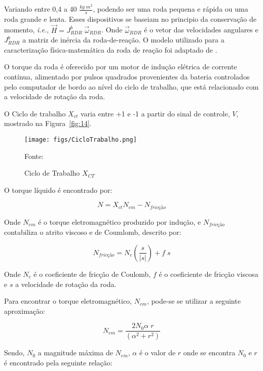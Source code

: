 Variando entre 0,4 a 40 $\frac{kg\;m^2}{s}$, podendo ser uma roda pequena e rápida ou uma roda grande e lenta. Esses dispositivos se baseiam no principio da conservação de momento, \textit{i.e.}, $\vec{H}=J^b_{RDR}\;\vec{\omega}_{RDR}$. Onde $\vec{\omega}_{RDR}$ é o vetor das velocidades angulares e $J^b_{RDR}$ a matriz de inércia da roda-de-reação. O modelo utilizado para a caracterização física-matemática da roda de reação foi adaptado de \cite[p.~270-271]{wertz2012spacecraft}.

O torque da roda é oferecido por um motor de indução elétrica de corrente contínua, alimentado por pulsos quadrados provenientes da bateria controlados pelo computador de bordo ao nível do ciclo de trabalho, que está relacionado com a velocidade de rotação da roda.

O Ciclo de trabalho $X_{ct}$ varia entre +1 e -1 a partir do sinal de controle, $V$, mostrado na Figura~\ref{fig:14}.

\begin{figure}[htpb]
\centering
\texttt{[image: figs/CicloTrabalho.png]}
\caption{Ciclo de Trabalho $X_{CT}$}
{Fonte: \cite[p.~271]{wertz2012spacecraft}}
\label{fig:6}
\end{figure}

O torque líquido é encontrado por:

\begin{equation}N=X_{ct}N_{em}-N_{fricção}\end{equation}

Onde $N_{em}$ é o torque eletromagnético produzido por indução, e $N_{fricção}$ contabiliza o atrito viscoso e de Coumlomb, descrito por:

\begin{equation}N_{fricção}=N_c\left (\frac{s}{|s|}\right )+f\;s\end{equation}

Onde $N_c$ é o coeficiente de fricção de Coulomb, $f$ é o coeficiente de fricção viscosa e $s$ a velocidade de rotação da roda.

Para encontrar o torque eletromagnético, $N_{em}$, pode-se se utilizar a seguinte aproximação:

\begin{equation} N_{em} = \frac{2N_0\alpha\;r}{(\alpha^2+r^2)}\end{equation}

Sendo, $N_0$ a magnitude máxima de $N_{em}$, $\alpha$ é o valor de $r$ onde se encontra $N_0$ e $r$ é encontrado pela seguinte relação:

